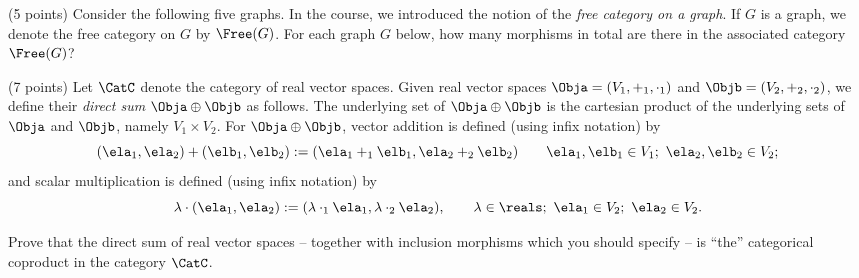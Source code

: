 \documentclass[paper=8.125in:10.250in,pagesize=pdftex,
    headinclude=false,footinclude=false,oneside,egregdoesnotlikesansseriftitles]{kaobook}
\begin{document}
\newpage



\begin{gradedexercise}\label{ex:FreeCatOnGraph}
(5 points) Consider the following five graphs. In the course, we introduced the notion of the \emph{free category on a graph}. If $G$ is a graph, we denote the free category on $G$ by $\Free(G)$. For each graph $G$ below, how many morphisms in total are there in the associated category~$\Free(G)$?

  \begin{center}
  \end{center}
\end{gradedexercise}


\newpage


\begin{gradedexercise}\label{ex:DirectSumCopr}
(7 points) Let $\CatC$ denote the category of real vector spaces. Given real vector spaces $\Obja = (V_1, +_1, \cdot_1)$ and $\Objb = (V_2, +_2, \cdot_2)$, we define their \emph{direct sum} $\Obja \oplus \Objb$ as follows. 
The underlying set of $\Obja \oplus \Objb$ is the cartesian product of the underlying sets of $\Obja$ and $\Objb$, namely $V_1 \times V_2$. For $\Obja \oplus \Objb$, vector addition is defined (using infix notation) by
$$(\ela_1, \ela_2) + (\elb_1, \elb_2) := (\ela_1 +_1 \elb_1, \ela_2 +_2 \elb_2) \quad \quad \ela_1, \elb_1 \in V_1; \ \ela_2, \elb_2 \in V_2;$$
and scalar multiplication is defined (using infix notation) by
$$\lambda \cdot (\ela_1, \ela_2) := (\lambda \cdot_1 \ela_1, \lambda \cdot_2 \ela_2), \quad \quad \lambda \in \reals; \ \ela_1 \in V_2; \ \ela_2 \in V_2.$$

Prove that the direct sum of real vector spaces -- together with inclusion morphisms which you should specify -- is ``the'' categorical coproduct in the category $\CatC$. 
\end{gradedexercise}


\newpage
\end{document}
